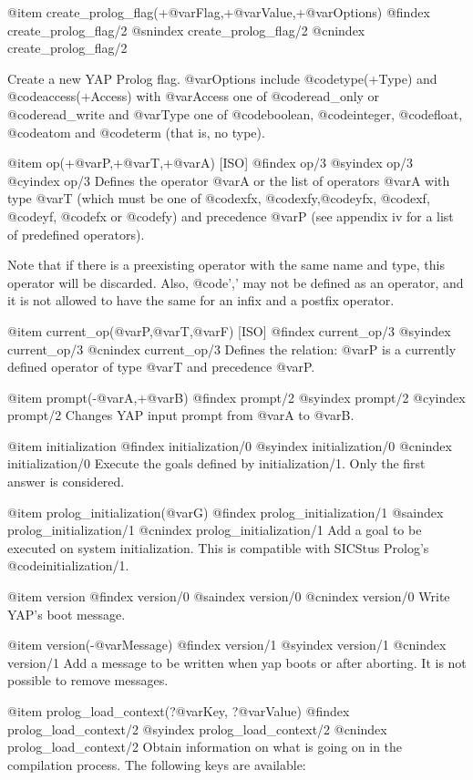 {{{{{{{{{@item create_prolog_flag(+@var{Flag},+@var{Value},+@var{Options})
@findex create_prolog_flag/2
@snindex create_prolog_flag/2
@cnindex create_prolog_flag/2

Create a new YAP Prolog flag. @var{Options} include @code{type(+Type)} and @code{access(+Access)} with @var{Access}
one of @code{read_only} or @code{read_write} and @var{Type} one of @code{boolean}, @code{integer}, @code{float}, @code{atom}
and @code{term} (that is, no type).

@item op(+@var{P},+@var{T},+@var{A}) [ISO]
@findex op/3
@syindex op/3
@cyindex op/3
Defines the operator @var{A} or the list of operators @var{A} with type
@var{T} (which must be one of @code{xfx}, @code{xfy},@code{yfx},
@code{xf}, @code{yf}, @code{fx} or @code{fy}) and precedence @var{P}
(see appendix iv for a list of predefined operators).

Note that if there is a preexisting operator with the same name and
type, this operator will be discarded. Also, @code{','} may not be defined
as an operator, and it is not allowed to have the same for an infix and
a postfix operator.

@item current_op(@var{P},@var{T},@var{F}) [ISO]
@findex current_op/3
@syindex current_op/3
@cnindex current_op/3
Defines the relation: @var{P} is a currently defined  operator of type
@var{T} and precedence @var{P}.

@item prompt(-@var{A},+@var{B})
@findex prompt/2
@syindex prompt/2
@cyindex prompt/2
Changes YAP input prompt from @var{A} to @var{B}.

@item initialization
@findex initialization/0
@syindex initialization/0
@cnindex initialization/0
Execute the goals defined by initialization/1. Only the first answer is
considered.

@item prolog_initialization(@var{G})
@findex prolog_initialization/1
@saindex prolog_initialization/1
@cnindex prolog_initialization/1
Add a goal to be executed on system initialization. This is compatible
with SICStus Prolog's @code{initialization/1}.

@item version
@findex version/0
@saindex version/0
@cnindex version/0
Write YAP's boot message. 

@item version(-@var{Message})
@findex version/1
@syindex version/1
@cnindex version/1
Add a message to be written when yap boots or after aborting. It is not
possible to remove messages.

@item prolog_load_context(?@var{Key}, ?@var{Value})
@findex prolog_load_context/2
@syindex prolog_load_context/2
@cnindex prolog_load_context/2
Obtain information on what is going on in the compilation process. The
following keys are available:

}}}}}}}}}
